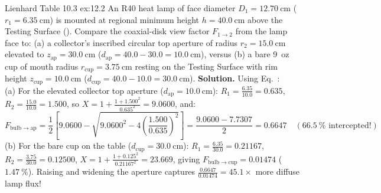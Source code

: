 \begin{workedexample}{Lienhard Table 10.3 }{ex:12.2}
An R40 heat lamp of face diameter $D_1 = \SI{12.70}{\centi\meter}$ ($r_1 = \SI{6.35}{\centi\meter}$) is mounted at regional minimum height $h = \SI{40.0}{\centi\meter}$ above the Testing Surface (). Compare the coaxial-disk view factor $F_{1\to 2}$ from the lamp face to: (a) a collector's inscribed circular top aperture of radius $r_2 = \SI{15.0}{\centi\meter}$ elevated to $z_{\mathrm{ap}} = \SI{30.0}{\centi\meter}$ ($d_{\mathrm{ap}} = 40.0 - 30.0 = \SI{10.0}{\centi\meter}$), versus (b) a bare 9~oz cup of mouth radius $r_{\mathrm{cup}} = \SI{3.75}{\centi\meter}$ resting on the Testing Surface with rim height $z_{\mathrm{cup}} = \SI{10.0}{\centi\meter}$ ($d_{\mathrm{cup}} = 40.0 - 10.0 = \SI{30.0}{\centi\meter}$).
\tcblower
\textbf{Solution.} Using Eq.~:\\
(a) For the elevated collector top aperture ($d_{\mathrm{ap}} = \SI{10.0}{\centi\meter}$): $R_1 = \frac{6.35}{10.0} = 0.635$, $R_2 = \frac{15.0}{10.0} = 1.500$, so $X = 1 + \frac{1 + 1.500^2}{0.635^2} = 9.0600$, and:
\[
  F_{\mathrm{bulb}\to\mathrm{ap}} = \frac{1}{2}\!\left[9.0600 - \sqrt{9.0600^2 - 4\left(\frac{1.500}{0.635}\right)^{\!2}}\right] = \frac{9.0600 - 7.7307}{2} = \mathbf{0.6647} \quad (\SI{66.5}{\percent}\text{ intercepted!})
\]
(b) For the bare cup on the table ($d_{\mathrm{cup}} = \SI{30.0}{\centi\meter}$): $R_1 = \frac{6.35}{30.0} = 0.21167$, $R_2 = \frac{3.75}{30.0} = 0.12500$, $X = 1 + \frac{1 + 0.125^2}{0.21167^2} = 23.669$, giving $F_{\mathrm{bulb}\to\mathrm{cup}} = \mathbf{0.01474}$ ($\SI{1.47}{\percent}$). Raising and widening the aperture captures $\frac{0.6647}{0.01474} = \mathbf{45.1\times}$ more diffuse lamp flux!
\end{workedexample}

